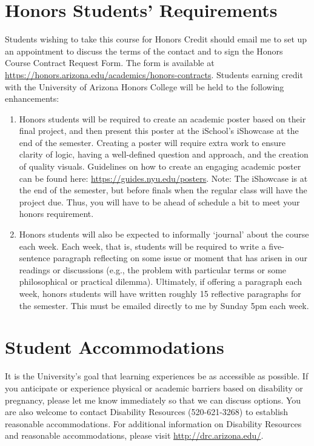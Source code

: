 \documentclass[
]{book}
\begin{document}
\hypertarget{honors-students-requirements}{%
\section{Honors Students' Requirements}\label{honors-students-requirements}}

Students wishing to take this course for Honors Credit should email me to set up an appointment to discuss the terms of the contact and to sign the Honors Course Contract Request Form. The form is available at \url{https://honors.arizona.edu/academics/honors-contracts}. Students earning credit with the University of Arizona Honors College will be held to the following enhancements:

\begin{enumerate}
\def\labelenumi{\arabic{enumi}.}
\item
  Honors students will be required to create an academic poster based on their final project, and then present this poster at the iSchool's iShowcase at the end of the semester. Creating a poster will require extra work to ensure clarity of logic, having a well-defined question and approach, and the creation of quality visuals. Guidelines on how to create an engaging academic poster can be found here: \url{https://guides.nyu.edu/posters}. Note: The iShowcase is at the end of the semester, but before finals when the regular class will have the project due. Thus, you will have to be ahead of schedule a bit to meet your honors requirement.
\item
  Honors students will also be expected to informally `journal' about the course each week. Each week, that is, students will be required to write a five-sentence paragraph reflecting on some issue or moment that has arisen in our readings or discussions (e.g., the problem with particular terms or some philosophical or practical dilemma). Ultimately, if offering a paragraph each week, honors students will have written roughly 15 reflective paragraphs for the semester. This must be emailed directly to me by Sunday 5pm each week.
\end{enumerate}

\hypertarget{student-accommodations}{%
\section{Student Accommodations}\label{student-accommodations}}

It is the University's goal that learning experiences be as accessible as possible. If you anticipate or experience physical or academic barriers based on disability or pregnancy, please let me know immediately so that we can discuss options. You are also welcome to contact Disability Resources (520-621-3268) to establish reasonable accommodations. For additional information on Disability Resources and reasonable accommodations, please visit \url{http://drc.arizona.edu/}.
\end{document}
